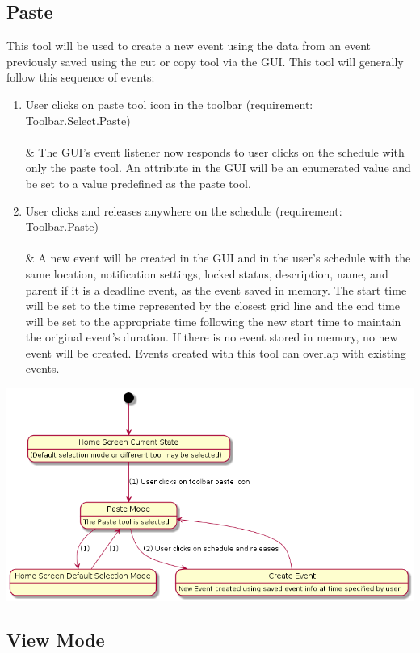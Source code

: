 \documentclass{scrreprt}
\begin{document}
\subsection{Paste}
This tool will be used to create a new event using the data from an event previously saved using the cut or copy tool via the GUI. This tool will generally follow this sequence of events:
\begin{enumerate}
    \item User clicks on paste tool icon in the toolbar (requirement: Toolbar.Select.Paste)\\
    \\ & The GUI's event listener now responds to user clicks on the schedule with only the paste tool. An attribute in the GUI will be an enumerated value and be set to a value predefined as the paste tool.
    \item User clicks and releases anywhere on the schedule (requirement: Toolbar.Paste)\\
    \\ & A new event will be created in the GUI and in the user's schedule with the same location, notification settings, locked status, description, name, and parent if it is a deadline event, as the event saved in memory. The start time will be set to the time represented by the closest grid line and the end time will be set to the appropriate time following the new start time to maintain the original event's duration. If there is no event stored in memory, no new event will be created. Events created with this tool can overlap with existing events.
\end{enumerate}
\includegraphics[width=\textwidth]{paste.png}

\subsection{View Mode}
\end{document}
